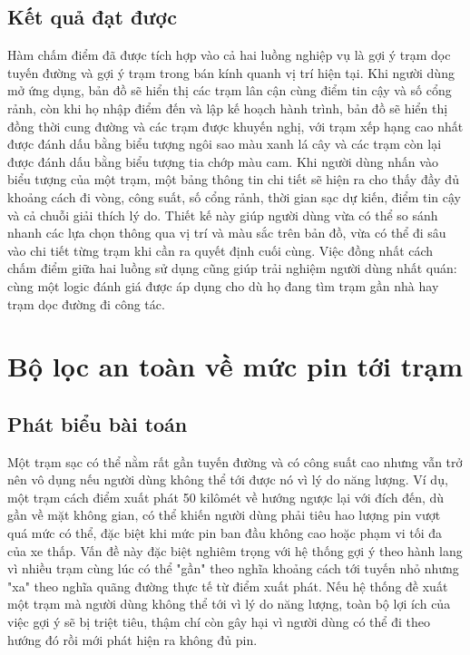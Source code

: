 \documentclass[../Main.tex]{subfiles}
\begin{document}
\subsection{Kết quả đạt được}

Hàm chấm điểm đã được tích hợp vào cả hai luồng nghiệp vụ là gợi ý trạm dọc tuyến đường và gợi ý trạm trong bán kính quanh vị trí hiện tại. Khi người dùng mở ứng dụng, bản đồ sẽ hiển thị các trạm lân cận cùng điểm tin cậy và số cổng rảnh, còn khi họ nhập điểm đến và lập kế hoạch hành trình, bản đồ sẽ hiển thị đồng thời cung đường và các trạm được khuyến nghị, với trạm xếp hạng cao nhất được đánh dấu bằng biểu tượng ngôi sao màu xanh lá cây và các trạm còn lại được đánh dấu bằng biểu tượng tia chớp màu cam. Khi người dùng nhấn vào biểu tượng của một trạm, một bảng thông tin chi tiết sẽ hiện ra cho thấy đầy đủ khoảng cách đi vòng, công suất, số cổng rảnh, thời gian sạc dự kiến, điểm tin cậy và cả chuỗi giải thích lý do. Thiết kế này giúp người dùng vừa có thể so sánh nhanh các lựa chọn thông qua vị trí và màu sắc trên bản đồ, vừa có thể đi sâu vào chi tiết từng trạm khi cần ra quyết định cuối cùng. Việc đồng nhất cách chấm điểm giữa hai luồng sử dụng cũng giúp trải nghiệm người dùng nhất quán: cùng một logic đánh giá được áp dụng cho dù họ đang tìm trạm gần nhà hay trạm dọc đường đi công tác.

\section{Bộ lọc an toàn về mức pin tới trạm}
\label{section:5.3}

\subsection{Phát biểu bài toán}

Một trạm sạc có thể nằm rất gần tuyến đường và có công suất cao nhưng vẫn trở nên vô dụng nếu người dùng không thể tới được nó vì lý do năng lượng. Ví dụ, một trạm cách điểm xuất phát 50 kilômét về hướng ngược lại với đích đến, dù gần về mặt không gian, có thể khiến người dùng phải tiêu hao lượng pin vượt quá mức có thể, đặc biệt khi mức pin ban đầu không cao hoặc phạm vi tối đa của xe thấp. Vấn đề này đặc biệt nghiêm trọng với hệ thống gợi ý theo hành lang vì nhiều trạm cùng lúc có thể "gần" theo nghĩa khoảng cách tới tuyến nhỏ nhưng "xa" theo nghĩa quãng đường thực tế từ điểm xuất phát. Nếu hệ thống đề xuất một trạm mà người dùng không thể tới vì lý do năng lượng, toàn bộ lợi ích của việc gợi ý sẽ bị triệt tiêu, thậm chí còn gây hại vì người dùng có thể đi theo hướng đó rồi mới phát hiện ra không đủ pin.
\end{document}

